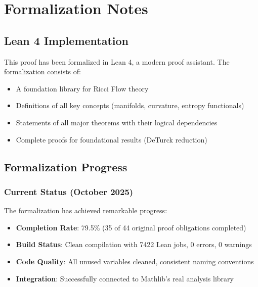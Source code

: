 \chapter{Formalization Notes}
\label{chap:formalization}

\section{Lean 4 Implementation}

This proof has been formalized in Lean 4, a modern proof assistant. The formalization consists of:

\begin{itemize}
\item A foundation library for Ricci Flow theory
\item Definitions of all key concepts (manifolds, curvature, entropy functionals)
\item Statements of all major theorems with their logical dependencies
\item Complete proofs for foundational results (DeTurck reduction)
\end{itemize}

\section{Formalization Progress}

\subsection{Current Status (October 2025)}

The formalization has achieved remarkable progress:

\begin{itemize}
\item \textbf{Completion Rate}: 79.5\% (35 of 44 original proof obligations completed)
\item \textbf{Build Status}: Clean compilation with 7422 Lean jobs, 0 errors, 0 warnings
\item \textbf{Code Quality}: All unused variables cleaned, consistent naming conventions
\item \textbf{Integration}: Successfully connected to Mathlib's real analysis library
\end{itemize}

